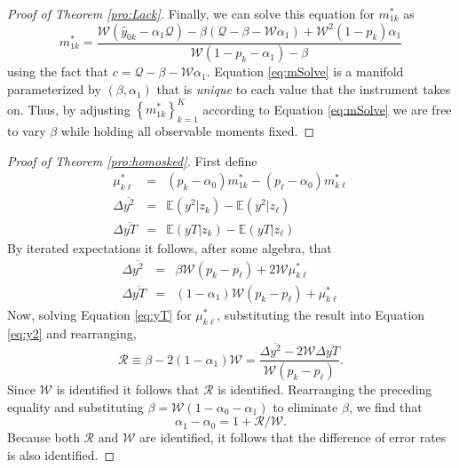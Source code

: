\begin{proof}[Proof of Theorem \ref{pro:Lack}]
Finally, we can solve this equation for $m^*_{1k}$ as
\begin{equation}
  m^*_{1k} = \frac{\mathcal{W}(\hat{y}_{0k}-\alpha_1 \mathcal{Q}) - \beta(\mathcal{Q}-\beta-\mathcal{W}\alpha_1) + \mathcal{W}^2(1-p_k)\alpha_1}{\mathcal{W}(1-p_k - \alpha_1) - \beta}
  \label{eq:mSolve}
\end{equation}
using the fact that $c = \mathcal{Q} - \beta - \mathcal{W}\alpha_1$.
Equation \ref{eq:mSolve} is a manifold parameterized by $(\beta,\alpha_1)$ that is \emph{unique} to each value that the instrument takes on. 
Thus, by adjusting $\left\{ m^*_{1k} \right\}_{k=1}^K$ according to Equation \ref{eq:mSolve} we are free to vary $\beta$ while holding all observable moments fixed. 
\end{proof}

\begin{proof}[Proof of Theorem \ref{pro:homosked}]
  First define
  \begin{eqnarray}
    \label{eq:mustar}
    \mu_{k\ell}^* &=&  (p_k - \alpha_0) m_{1k}^* - (p_{\ell}-\alpha_0)m_{k\ell}^* \\
    \label{eq:y2def}
    \Delta\overline{y^2} &=&  \mathbb{E}(y^2|z_k) - \mathbb{E}(y^2|z_\ell)\\
    \label{eq:yTdef}
    \Delta\overline{yT} &=&  \mathbb{E}(yT|z_k) - \mathbb{E}(yT|z_\ell)
  \end{eqnarray}
  By iterated expectations it follows, after some algebra, that
  \begin{eqnarray}
    \label{eq:y2}
    \Delta\overline{y^2} &=& \beta \mathcal{W} (p_k - p_\ell)  + 2 \mathcal{W} \mu_{k\ell}^* \\
    \label{eq:yT}
    \Delta\overline{yT} &=& (1-\alpha_1)\mathcal{W}(p_k - p_\ell) + \mu_{k\ell}^* 
  \end{eqnarray}
  Now, solving Equation \ref{eq:yT} for $\mu_{k\ell}^*$, substituting the result into Equation \ref{eq:y2} and rearranging,
  \begin{equation}
    \mathcal{R} \equiv \beta - 2(1-\alpha_1)\mathcal{W} = \frac{\Delta\overline{y^2} - 2 \mathcal{W}\Delta\overline{yT}}{\mathcal{W}(p_k - p_\ell)}.
    \label{eq:Rdef}
  \end{equation}
  Since $\mathcal{W}$ is identified it follows that $\mathcal{R}$ is identified.
  Rearranging the preceding equality and substituting $\beta=\mathcal{W}(1-\alpha_0 -\alpha_1)$ to eliminate $\beta$, we find that
  \begin{equation}
    \alpha_1 - \alpha_0 = 1 + \mathcal{R}/\mathcal{W}.
   \label{eq:aDiff}
  \end{equation}
  Because both $\mathcal{R}$ and $\mathcal{W}$ are identified, it follows that the difference of error rates is also identified.
\end{proof}

